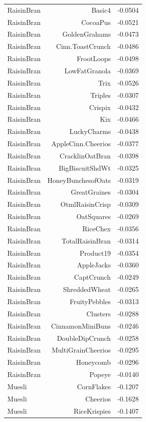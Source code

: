 \begin{longtable}{@{}lrr@{}}
RaisinBran & Basic4 & -0.0504 \\
RaisinBran & CocoaPus & -0.0521 \\
RaisinBran & GoldenGrahams & -0.0473 \\
RaisinBran & Cinn.ToastCrunch & -0.0486 \\
RaisinBran & FrootLoops & -0.0498 \\
RaisinBran & LowFatGranola & -0.0369 \\
RaisinBran & Trix & -0.0526 \\
RaisinBran & Triples & -0.0307 \\
RaisinBran & Crispix & -0.0432 \\
RaisinBran & Kix & -0.0466 \\
RaisinBran & LuckyCharms & -0.0438 \\
RaisinBran & AppleCinn.Cheerios & -0.0377 \\
RaisinBran & CracklinOatBran & -0.0398 \\
RaisinBran & BigBiscuitShdWt & -0.0325 \\
RaisinBran & HoneyBunchesofOats & -0.0319 \\
RaisinBran & GreatGraines & -0.0304 \\
RaisinBran & OtmlRaisinCrisp & -0.0309 \\
RaisinBran & OatSquares & -0.0269 \\
RaisinBran & RiceChex & -0.0356 \\
RaisinBran & TotalRaisinBran & -0.0314 \\
RaisinBran & Product19 & -0.0354 \\
RaisinBran & AppleJacks & -0.0360 \\
RaisinBran & CaptCrunch & -0.0249 \\
RaisinBran & ShreddedWheat & -0.0265 \\
RaisinBran & FruityPebbles & -0.0313 \\
RaisinBran & Clusters & -0.0288 \\
RaisinBran & CinnamonMiniBuns & -0.0246 \\
RaisinBran & DoubleDipCrunch & -0.0258 \\
RaisinBran & MultiGrainCheerios & -0.0295 \\
RaisinBran & Honeycomb & -0.0296 \\
RaisinBran & Popeye & -0.0140 \\
Muesli & CornFlakes & -0.1207 \\
Muesli & Cheerios & -0.1628 \\
Muesli & RiceKrispies & -0.1407 \\

\end{longtable}
